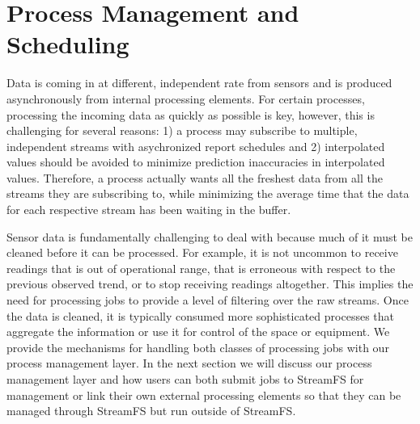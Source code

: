 \chapter{Process Management and Scheduling}

Data is coming in at different, independent rate from sensors and is produced asynchronously from internal processing elements.
For certain processes, processing the incoming data as quickly as possible is key, however, this is challenging for several reasons:
1) a process may subscribe to multiple, independent streams with asychronized report schedules and 2) interpolated values
should be avoided to minimize prediction inaccuracies in interpolated values.  Therefore, a process actually wants all the freshest
data from all the streams they are subscribing to, while minimizing the average time that the data for each respective stream has 
been waiting in the buffer.

Sensor data is fundamentally challenging to deal with because much of it must be cleaned before it can be processed.  For example,
it is not uncommon to receive readings that is out of operational range, that is erroneous with respect to the previous observed trend,
or to stop receiving readings altogether.  This implies the need for processing jobs to provide a level of filtering over the raw streams.
Once the data is cleaned, it is typically consumed more sophisticated processes that aggregate the information or use it for control
of the space or equipment.  We provide the mechanisms for handling both classes of processing jobs with our process management layer.
In the next section we will discuss our process management layer and how users can both submit jobs to StreamFS for management or link
their own external processing elements so that they can be managed through StreamFS but run outside of StreamFS.

% 







